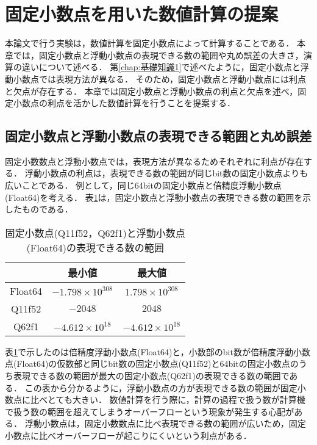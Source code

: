 \section{固定小数点を用いた数値計算の提案}
\label{chap:提案手法}
\begin{comment}
    ストーリー：
    固定小数点演算は浮動小数点演算よりも計算時間が速いとされている．
    しかし，浮動小数点に比べて精度が低くなる恐れがある．
    本論文では，固定小数点と浮動小数点での数値計算の結果を比べ，固定小数点での演算も浮動小数点と同程度の精度で計算できることを示した．
    実験結果より固定小数点演算で浮動小数点より高速で，浮動小数点と同程度の計算を実現できるのではないかと考える．
\end{comment}
本論文で行う実験は，数値計算を固定小数点によって計算することである．
本章では，固定小数点と浮動小数点の表現できる数の範囲や丸め誤差の大きさ，演算の違いについて述べる．
第\ref{chap:基礎知識1}で述べたように，固定小数点と浮動小数点では表現方法が異なる．
そのため，固定小数点と浮動小数点には利点と欠点が存在する．
本章では固定小数点と浮動小数点の利点と欠点を述べ，固定小数点の利点を活かした数値計算を行うことを提案する．

\subsection{固定小数点と浮動小数点の表現できる範囲と丸め誤差}
固定小数数点と浮動小数点では，表現方法が異なるためそれぞれに利点が存在する．
浮動小数点の利点は，表現できる数の範囲が同じbit数の固定小数点よりも広いことである．
例として，同じ64bitの固定小数点と倍精度浮動小数点(Float64)を考える．
表\ref{tab:fixed_float_range}は，固定小数点と浮動小数点の表現できる数の範囲を示したものである．

\begin{table}[H]
    \centering
    \caption{固定小数点(Q11f52，Q62f1)と浮動小数点(Float64)の表現できる数の範囲}
    \begin{tabular}{c|c|c}
         & 最小値 & 最大値　\\ \hline\hline
          Float64 & $-1.798 \times 10^{308}$ & $1.798 \times 10^{308}$ \\
          Q11f52 & $-2048$ & $2048$ \\
          Q62f1 & $-4.612 \times 10^{18}$ & $-4.612 \times 10^{18}$
    \end{tabular}
    \label{tab:fixed_float_range}
\end{table}

表\ref{tab:fixed_float_range}で示したのは倍精度浮動小数点(Float64)と，小数部のbit数が倍精度浮動小数点(Float64)の仮数部と同じbit数の固定小数点(Q11f52)と64bitの固定小数点のうち表現できる数の範囲が最大の固定小数点(Q62f1)の表現できる数の範囲である．
この表から分かるように，浮動小数点の方が表現できる数の範囲が固定小数点に比べとても大きい．
数値計算を行う際に，計算の過程で扱う数が計算機で扱う数の範囲を超えてしまうオーバーフローという現象が発生する心配がある．
浮動小数点は，固定小数数点に比べ表現できる数の範囲が広いため，固定小数点に比べオーバーフローが起こりにくいという利点がある．

